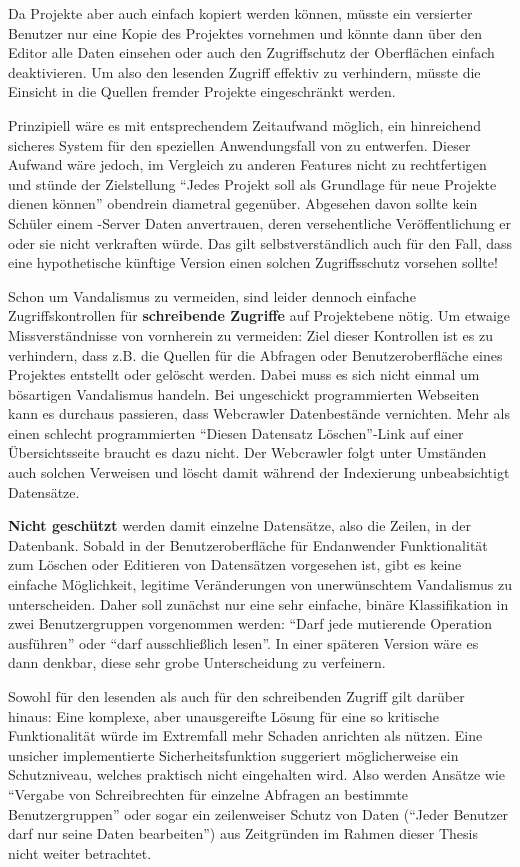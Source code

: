 Da Projekte aber auch einfach kopiert werden können, müsste ein versierter Benutzer nur eine Kopie des Projektes vornehmen und könnte dann über den Editor alle Daten einsehen oder auch den Zugriffschutz der Oberflächen einfach deaktivieren. Um also den lesenden Zugriff effektiv zu verhindern, müsste die Einsicht in die Quellen fremder Projekte eingeschränkt werden.

Prinzipiell wäre es mit entsprechendem Zeitaufwand möglich, ein hinreichend sicheres System für den speziellen Anwendungsfall von \idename{} zu entwerfen. Dieser Aufwand wäre jedoch, im Vergleich zu anderen Features nicht zu rechtfertigen und stünde der Zielstellung "`Jedes Projekt soll als Grundlage für neue Projekte dienen können"' obendrein diametral gegenüber. Abgesehen davon sollte kein Schüler einem \idename{}-Server Daten anvertrauen, deren versehentliche Veröffentlichung er oder sie nicht verkraften würde. Das gilt selbstverständlich auch für den Fall, dass eine hypothetische künftige Version einen solchen Zugriffsschutz vorsehen sollte!

Schon um Vandalismus zu vermeiden, sind leider dennoch einfache Zugriffskontrollen für \textbf{schreibende Zugriffe} auf Projektebene nötig. Um etwaige Missverständnisse von vornherein zu vermeiden: Ziel dieser Kontrollen ist es zu verhindern, dass z.B. die Quellen für die Abfragen oder Benutzeroberfläche eines Projektes entstellt oder gelöscht werden. Dabei muss es sich nicht einmal um bösartigen Vandalismus handeln. Bei ungeschickt programmierten Webseiten kann es durchaus passieren, dass Webcrawler Datenbestände vernichten. Mehr als einen schlecht programmierten "`Diesen Datensatz Löschen"'-Link auf einer Übersichtsseite braucht es dazu nicht. Der Webcrawler folgt unter Umständen auch solchen Verweisen und löscht damit während der Indexierung unbeabsichtigt Datensätze.

\textbf{Nicht geschützt} werden damit einzelne Datensätze, also die Zeilen, in der Datenbank. Sobald in der Benutzeroberfläche für Endanwender Funktionalität zum Löschen oder Editieren von Datensätzen vorgesehen ist, gibt es keine einfache Möglichkeit, legitime Veränderungen von unerwünschtem Vandalismus zu unterscheiden. Daher soll zunächst nur eine sehr einfache, binäre Klassifikation in zwei Benutzergruppen vorgenommen werden: "`Darf jede mutierende Operation ausführen"' oder "`darf ausschließlich lesen"'. In einer späteren Version wäre es dann denkbar, diese sehr grobe Unterscheidung zu verfeinern.

Sowohl für den lesenden als auch für den schreibenden Zugriff gilt darüber hinaus: Eine komplexe, aber unausgereifte Lösung für eine so kritische Funktionalität würde im Extremfall mehr Schaden anrichten als nützen. Eine unsicher implementierte Sicherheitsfunktion suggeriert möglicherweise ein Schutzniveau, welches praktisch nicht eingehalten wird. Also werden Ansätze wie "`Vergabe von Schreibrechten für einzelne Abfragen an bestimmte Benutzergruppen"' oder sogar ein zeilenweiser Schutz von Daten ("`Jeder Benutzer darf nur seine Daten bearbeiten"') aus Zeitgründen im Rahmen dieser Thesis nicht weiter betrachtet.

